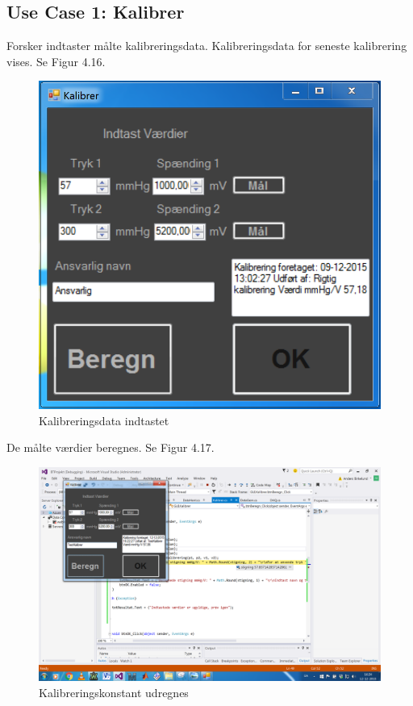 \subsection{Use Case 1: Kalibrer}

Forsker indtaster målte kalibreringsdata. Kalibreringsdata for seneste kalibrering vises. Se Figur 4.16.

\begin{figure}[H]
	\centering
	\includegraphics[width=1\textwidth]{Figurer/Test_Kalibrer_1}
	\caption{Kalibreringsdata indtastet}
\end{figure}

De målte værdier beregnes. Se Figur 4.17.

\begin{figure}[H]
	\centering
	\includegraphics[width=1\textwidth]{Figurer/Test_Kalibrer_2}
	\caption{Kalibreringskonstant udregnes}
\end{figure}

